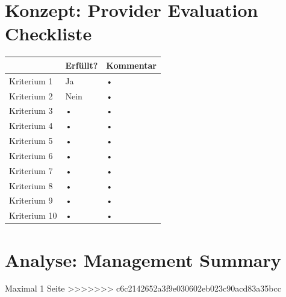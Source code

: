 \chapter{Konzept: Provider Evaluation Checkliste}
\begin{table}[H]
\begin{tabular}{|p{}|l|p{}|}
\hline 
 & Erfüllt? & Kommentar \\ 
\hline 
Kriterium 1 & Ja & • \\ 
\hline 
Kriterium 2 & Nein & • \\ 
\hline 
Kriterium 3 & • & • \\ 
\hline 
Kriterium 4 & • & • \\ 
\hline 
Kriterium 5 & • & • \\ 
\hline 
Kriterium 6 & • & • \\ 
\hline 
Kriterium 7 & • & • \\ 
\hline 
Kriterium 8 & • & • \\ 
\hline 
Kriterium 9 & • & • \\ 
\hline 
Kriterium 10 & • & • \\ 
\hline 
\end{tabular} 
\end{table}

\chapter{Analyse: Management Summary}
Maximal 1 Seite
>>>>>>> c6c2142652a3f9e030602eb023c90acd83a35bcc
